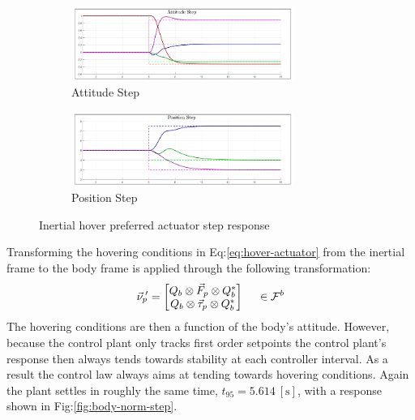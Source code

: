 \begin{figure}[hbtp]
\centering
\begin{subfigure}{\textwidth}
\centering
\includegraphics[width=0.8\textwidth]{graphs/inertial_norm_attitude}
\caption{Attitude Step}
\label{fig:inertial_norm_attitude}
\end{subfigure}
\begin{subfigure}{\textwidth}
\centering
\includegraphics[width=0.8\textwidth]{graphs/inertial_norm_position}
\caption{Position Step}
\label{fig:inertia_norm_position}
\end{subfigure}
\caption{Inertial hover preferred actuator step response}
\label{fig:inertial-norm-step}
\end{figure}
\par
Transforming the hovering conditions in Eq:\ref{eq:hover-actuator} from the inertial frame to the body frame is applied through the following transformation:
\begin{equation}
\vec{\nu}_p\text{}\hspace{-2pt}'=\begin{bmatrix}
Q_b\otimes\vec{F}_p\otimes Q_b^*\\
Q_b\otimes\vec{\tau}_p\otimes Q_b^*
\end{bmatrix}~~~~\in\mathcal{F}^{b}
\end{equation}
\newpage
The hovering conditions are then a function of the body's attitude. However, because the control plant only tracks first order setpoints the control plant's response then always tends towards stability at each controller interval. As a result the control law always aims at tending towards hovering conditions. Again the plant settles in roughly the same time, $t_{95}=5.614~[\text{s}]$, with a response shown in Fig:\ref{fig:body-norm-step}.
